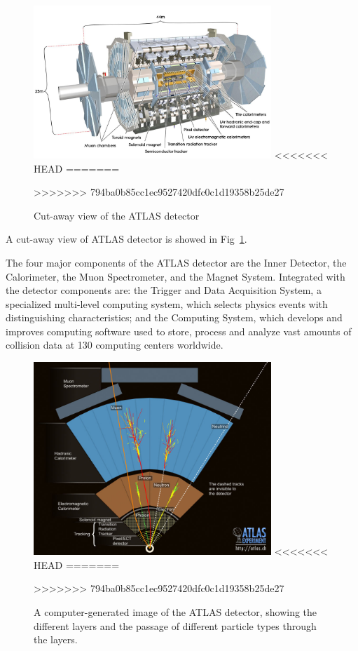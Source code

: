 \begin{figure}[htbp]
 \begin{center}
 \includegraphics[width=0.8\textwidth]{chapters/c4/figures/atlas.jpg}
<<<<<<< HEAD
=======

>>>>>>> 794ba0b85cc1ec9527420dfc0c1d19358b25de27
 \end{center}
 \caption{Cut-away view of the ATLAS detector}
 \label{fig:cutaway}
\end{figure}
A cut-away view of ATLAS detector is showed in Fig~\ref{fig:cutaway}. 
\par The four major components of the ATLAS detector are the Inner Detector, the Calorimeter, the Muon Spectrometer,
 and the Magnet System. Integrated with the detector components are: the Trigger and Data Acquisition System, 
a specialized multi-level computing system, which selects physics events with distinguishing characteristics; 
and the Computing System, which develops and improves computing software used to store, process and analyze vast amounts of collision data 
at 130 computing centers worldwide\cite{atlas}.
\begin{figure}[htbp]
 \begin{center}
 \includegraphics[width=0.8\textwidth]{chapters/c4/figures/eve_gen.jpg}
<<<<<<< HEAD
=======

>>>>>>> 794ba0b85cc1ec9527420dfc0c1d19358b25de27
 \end{center}
 \caption{A computer-generated image of
the ATLAS detector, showing the
different layers and the passage
of different particle types through
the layers.}
 \label{fig:eve-gen}
\end{figure}
